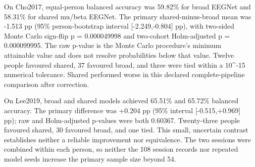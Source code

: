 \documentclass[11pt]{article}
\begin{document}
On Cho2017, equal-person balanced accuracy was 59.82\% for broad EEGNet and 58.31\% for shared mu/beta EEGNet. The primary shared-minus-broad mean was -1.513 pp (95\% person-bootstrap interval [-2.249,-0.804] pp), with two-sided Monte Carlo sign-flip p = 0.000049998 and two-cohort Holm-adjusted p = 0.000099995. The raw p-value is the Monte Carlo procedure's minimum attainable value and does not resolve probabilities below that value. Twelve people favoured shared, 37 favoured broad, and three were tied within a 10\textasciicircum{}-15 numerical tolerance. Shared performed worse in this declared complete-pipeline comparison after correction.

On Lee2019, broad and shared models achieved 65.51\% and 65.72\% balanced accuracy. The primary difference was +0.204 pp (95\% interval [-0.515,+0.969] pp); raw and Holm-adjusted p-values were both 0.60367. Twenty-three people favoured shared, 30 favoured broad, and one tied. This small, uncertain contrast establishes neither a reliable improvement nor equivalence. The two sessions were combined within each person, so neither the 108 session records nor repeated model seeds increase the primary sample size beyond 54.
\end{document}
